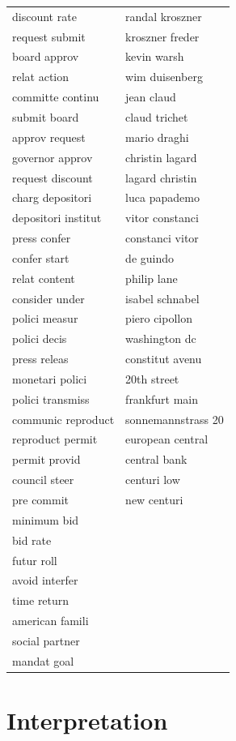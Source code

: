 \begin{longtable}{p{}p{}}
discount rate & randal kroszner \\
request submit & kroszner freder \\
board approv & kevin warsh \\
relat action & wim duisenberg \\
committe continu & jean claud \\
submit board & claud trichet \\
approv request & mario draghi \\
governor approv & christin lagard \\
request discount & lagard christin \\
charg depositori & luca papademo \\
depositori institut & vitor constanci \\
press confer & constanci vitor \\
confer start & de guindo \\
relat content & philip lane \\
consider under & isabel schnabel \\
polici measur & piero cipollon \\
polici decis & washington dc \\
press releas & constitut avenu \\
monetari polici & 20th street \\
polici transmiss & frankfurt main \\
communic reproduct & sonnemannstrass 20 \\
reproduct permit & european central \\
permit provid & central bank \\
council steer & centuri low \\
pre commit & new centuri \\
minimum bid &  \\
bid rate &  \\
futur roll &  \\
avoid interfer &  \\
time return &  \\
american famili &  \\
social partner &  \\
mandat goal &  \\
\bottomrule
\end{longtable}


\section{Interpretation}
\label{app:a1_interpretation}

